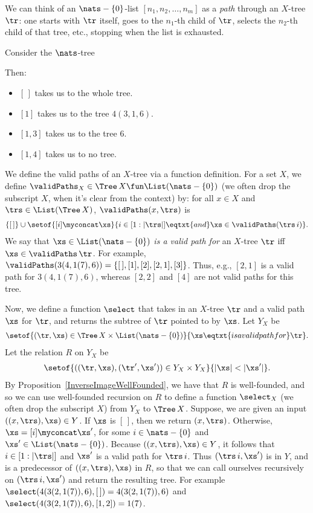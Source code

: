 We can think of an $\nats-\{0\}$-list $[n_1, n_2, \ldots, n_m]$ as a
\emph{path} through an $X$-tree $\tr$: one starts with $\tr$ itself,
goes to the $n_1$-th child of $\tr$, selects the $n_2$-th child of
that tree, etc., stopping when the list is exhausted.

Consider the $\nats$-tree
\begin{center}

\end{center}
Then:
\begin{itemize}
\item $[\,]$ takes us to the whole tree.

\item $[1]$ takes us to the tree $4(3,1,6)$.

\item $[1, 3]$ takes us to the tree $6$.

\item $[1, 4]$ takes us to no tree.
\end{itemize}

We define the valid paths of an $X$-tree via a function definition.
For a set $X$, we define $\validPaths_X\in\Tree\,X\fun\List(\nats-\{0\})$
(we often drop the subscript $X$, when it's clear from the context)
by: for all $x\in X$ and $\trs\in\List(\Tree\,X)$,
$\validPaths(x, \trs)$ is
\begin{gather*}
\{[\,]\} \cup
\setof{[i]\myconcat\xs}{i\in[1:|\trs|]\eqtxt{and}\xs\in\validPaths(\trs\,i)} .
\end{gather*}
We say that $\xs\in\List(\nats-\{0\})$ \emph{is a valid path for}
an $X$-tree $\tr$ iff $\xs\in\validPaths\,\tr$.
For example, $\validPaths(3(4,1(7),6)) = \{[\,], [1], [2], [2,1], [3]\}$.
Thus, e.g.,  $[2,1]$ is a valid path for $3(4,1(7),6)$, whereas
$[2,2]$ and $[4]$ are not valid paths for this tree.

Now, we define a function $\select$ that takes in an $X$-tree $\tr$ and
a valid path $\xs$ for $\tr$, and returns the subtree of
$\tr$ pointed to by $\xs$.
Let $Y_X$ be
\begin{gather*}
\setof{(\tr,\xs)\in\Tree\,X\times\List(\nats-\{0\})}%
{\xs\eqtxt{is a valid path for}\tr} .
\end{gather*}
Let the relation
$R$ on $Y_X$ be
\begin{gather*}
\setof{((\tr,\xs),(\tr',\xs'))\in Y_X\times Y_X}{|\xs|<|\xs'|} .
\end{gather*}
By Proposition~\ref{InverseImageWellFounded}, we have that $R$ is
well-founded, and so we can use well-founded recursion on $R$ to
define a function $\select_X$ (we often drop the subscript $X$) from
$Y_X$ to $\Tree\,X$.  Suppose, we are given an input $((x,\trs),\xs)\in
Y$.  If $\xs$ is $[\,]$, then we return $(x,\trs)$.  Otherwise,
$\xs=[i]\myconcat\xs'$, for some $i\in\nats-\{0\}$ and
$\xs'\in\List(\nats-\{0\})$.  Because $((x,\trs),\xs)\in Y$, it
follows that $i\in[1:|\trs|]$ and $\xs'$ is a valid path for
$\trs\,i$.  Thus $(\trs\,i, \xs')$ is in $Y$, and is a predecessor of
$((x,\trs),\xs)$ in $R$, so that we can call ourselves recursively on
$(\trs\,i, \xs')$ and return the resulting tree.  For example
$\select(4(3(2,1(7)),6), [\,]) = 4(3(2,1(7)),6)$ and
$\select(4(3(2,1(7)),6),[1,2]) = 1(7)$.

